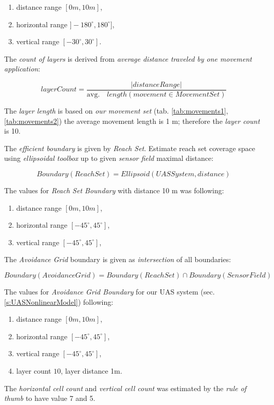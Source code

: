 \begin{enumerate}
    \item distance range $[0m,10m]$,
    \item horizontal range $]-180^\circ,180^\circ]$,
    \item vertical range $[-30^\circ,30^\circ]$.
\end{enumerate}

\noindent The \emph{count of layers} is derived from \emph{average distance traveled by one movement application}:

\begin{equation}
    layer Count = \frac{|distance Range|}{\text{avg.}\quad length(movement\in Movement Set)}
\end{equation}

\noindent The \emph{layer length} is based on \emph{our movement set} (tab. \ref{tab:movements1}, \ref{tab:movements2}) the average movement length is 1 m; therefore the \emph{layer count} is 10.

\noindent The \emph{efficient boundary} is given by  \emph{Reach Set}. Estimate reach set coverage space using \emph{ellipsoidal toolbox} \cite{kurzhanskiy2006ellipsoidal} up to given \emph{sensor field} maximal distance:

\begin{equation}
    Boundary(Reach Set) = Ellipsoid(UAS System,distance)
\end{equation}

The values for \emph{Reach Set Boundary} with distance 10 m was following:
\begin{enumerate}
    \item distance range $[0m,10m]$,
    \item horizontal range $[-45^\circ,45^\circ]$,
    \item vertical range $[-45^\circ,45^\circ]$,
\end{enumerate}

\noindent The \emph{Avoidance Grid} boundary is given as \emph{intersection} of all boundaries:

\begin{equation}
    Boundary(Avoidance Grid) =  Boundary(Reach Set) \cap Boundary(Sensor Field)
\end{equation}

\noindent The values for \emph{Avoidance Grid Boundary} for our UAS system (sec. \ref{s:UASNonlinearModel}) following:
\begin{enumerate}
    \item distance range $[0m,10m]$,
    \item horizontal range $[-45^\circ,45^\circ]$,
    \item vertical range $[-45^\circ,45^\circ]$,
    \item layer count $10$, layer distance 1m.
\end{enumerate}

The \emph{horizontal cell count} and \emph{vertical cell count} was estimated by the  \emph{rule of thumb} to have value 7 and 5.

